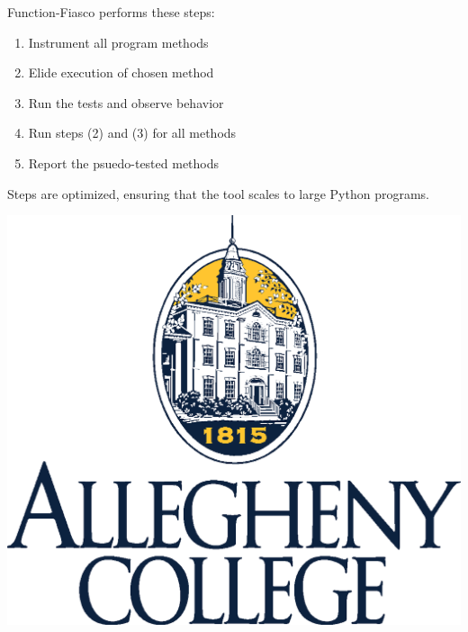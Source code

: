 \documentclass[a0paper,fleqn]{betterposter}
\begin{document}
{\begin{itemize}
  \end{itemize}

  \vspace*{.5in}
  Function-Fiasco performs these steps:

  \begin{enumerate}[leftmargin=.5in]

    \item Instrument all program methods
    \item Elide execution of chosen method
    \item Run the tests and observe behavior
    \item Run steps (2) and (3) for all methods
    \item Report the psuedo-tested methods

  \end{enumerate}

  \vspace*{.25in}
  Steps are optimized, ensuring that the tool scales to large Python programs.
  \vspace*{.5in}

  \vfill

  \includegraphics[width=\textwidth]{img/CollegeLogo.eps}\\

  }{


}
\end{document}
